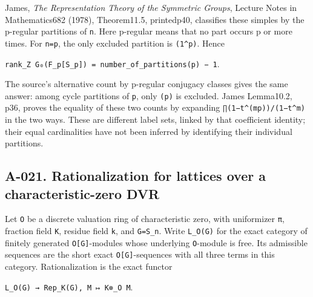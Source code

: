 \documentclass[
  10pt,
]{article}
\begin{document}
James, \emph{The Representation Theory of the Symmetric Groups}, Lecture
Notes in Mathematics682 (1978), Theorem11.5, printedp40, classifies
these simples by the p-regular partitions of \texttt{\small n}. Here
p-regular means that no part occurs p or more times. For
\texttt{\small n=\allowbreak{}p}, the only excluded partition is
\texttt{\small (\allowbreak{}1\textasciicircum{}p)\allowbreak{}}. Hence

\texttt{\small rank\_\allowbreak{}Z G₀(\allowbreak{}F\_\allowbreak{}p[\allowbreak{}S\_\allowbreak{}p]\allowbreak{})\allowbreak{} =\allowbreak{} number\_\allowbreak{}of\_\allowbreak{}partitions(\allowbreak{}p)\allowbreak{} − 1}.

The source's alternative count by p-regular conjugacy classes gives the
same answer: among cycle partitions of \texttt{\small p}, only
\texttt{\small (\allowbreak{}p)\allowbreak{}} is excluded. James
Lemma10.2, p36, proves the equality of these two counts by expanding
\texttt{\small ∏(\allowbreak{}1−t\textasciicircum{}(\allowbreak{}mp)\allowbreak{})\allowbreak{}/\allowbreak{}(\allowbreak{}1−t\textasciicircum{}m)\allowbreak{}}
in the two ways. These are different label sets, linked by that
coefficient identity; their equal cardinalities have not been inferred
by identifying their individual partitions.

\subsection{A-021. Rationalization for lattices over a
characteristic-zero
DVR}\label{a-021.-rationalization-for-lattices-over-a-characteristic-zero-dvr}

Let \texttt{\small O} be a discrete valuation ring of characteristic
zero, with uniformizer \texttt{\small π}, fraction field
\texttt{\small K}, residue field \texttt{\small k}, and
\texttt{\small G=\allowbreak{}S\_\allowbreak{}n}. Write
\texttt{\small L\_\allowbreak{}O(\allowbreak{}G)\allowbreak{}} for the
exact category of finitely generated
\texttt{\small O[\allowbreak{}G]\allowbreak{}}-modules whose underlying
\texttt{\small O}-module is free. Its admissible sequences are the short
exact \texttt{\small O[\allowbreak{}G]\allowbreak{}}-sequences with all
three terms in this category. Rationalization is the exact functor

\texttt{\small L\_\allowbreak{}O(\allowbreak{}G)\allowbreak{} →\allowbreak{} Rep\_\allowbreak{}K(\allowbreak{}G)\allowbreak{},\allowbreak{}    M ↦ K⊗\allowbreak{}\_\allowbreak{}O M}.
\end{document}

